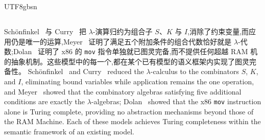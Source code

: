 \begin{CJK*}{UTF8}{gbsn}
\subsection{}

\paragraph{}
\ifPaperChinese
Sch\"onfinkel~\cite{schonfinkel1924-combinatory-logic} 与 Curry~\cite{curry1958-combinatory-logic} 把 $\lambda$-演算归约为组合子 $S$、$K$ 与 $I$,消除了约束变量,而应用仍是唯一的运算,Meyer~\cite{meyer1982-model-of-lambda-calculus} 证明了满足五个附加条件的组合代数恰好就是 $\lambda$-代数;Dolan~\cite{dolan2013-mov-turing-complete} 证明了 x86 的 \texttt{mov} 指令单独就已图灵完备,而不提供任何超越 RAM 机的抽象机制。这些模型中的每一个,都在某个已有模型的语义框架内实现了图灵完备性。
\else
Sch\"onfinkel~\cite{schonfinkel1924-combinatory-logic} and
Curry~\cite{curry1958-combinatory-logic} reduced the $\lambda$-calculus to the combinators $S$, $K$,
and $I$, eliminating bound variables while application remains the one operation, and
Meyer~\cite{meyer1982-model-of-lambda-calculus} showed that the combinatory algebras satisfying five
additional conditions are exactly the $\lambda$-algebras;
Dolan~\cite{dolan2013-mov-turing-complete} showed that the x86 \texttt{mov} instruction
alone is Turing complete, providing no abstraction mechanisms beyond those of the RAM Machine.
Each of these models achieves Turing completeness within the semantic framework of an existing model.
\fi


\end{CJK*}

